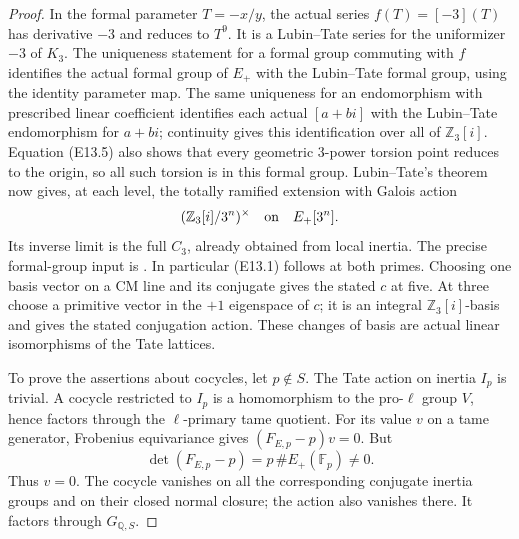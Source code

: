 \documentclass[11pt,oneside]{article}
\begin{document}
\begin{proof}
In the formal parameter $T=-x/y$, the actual series
$f(T)=[-3](T)$ has derivative $-3$ and reduces to $T^9$.
It is a Lubin--Tate series for the uniformizer $-3$ of $K_3$.
The uniqueness statement for a formal group commuting with
$f$ identifies the actual formal group of $E_+$ with the
Lubin--Tate formal group, using the identity parameter map.
The same uniqueness for an endomorphism with prescribed linear
coefficient identifies each actual $[a+bi]$ with the
Lubin--Tate endomorphism for $a+bi$; continuity gives this
identification over all of $\mathbb Z_3[i]$.
Equation (E13.5) also shows that every geometric $3$-power
torsion point reduces to the origin, so all such torsion is in
this formal group.  Lubin--Tate's theorem now gives, at each
level, the totally ramified extension with Galois action
\[
      (\mathbb Z_3[i]/3^n)^\times
             \quad\hbox{on}\quad E_+[3^n].
\]
Its inverse limit is the full $C_3$, already obtained from local
inertia.  The precise formal-group input is
\cite[Lemma 1, Theorem 1, and Theorem 2(b),(d),(e)]{E_density_LT}.
In particular (E13.1) follows at both primes.  Choosing one basis
vector on a CM line and its conjugate gives the stated $c$ at
five.  At three choose a primitive vector in the $+1$ eigenspace
of $c$; it is an integral $\mathbb Z_3[i]$-basis and gives the
stated conjugation action.  These changes of basis are actual
linear isomorphisms of the Tate lattices.

To prove the assertions about cocycles, let $p\notin S$.
The Tate action on inertia $I_p$ is trivial.  A cocycle restricted
to $I_p$ is a homomorphism to the pro-$\ell$ group $V$, hence
factors through the $\ell$-primary tame quotient.
For its value $v$ on a tame generator, Frobenius equivariance
gives $(F_{E,p}-p)v=0$.  But
\[
    \det(F_{E,p}-p)=p\,\#E_+(\mathbb F_p)\ne0.
\]
Thus $v=0$.  The cocycle vanishes on all the corresponding
conjugate inertia groups and on their closed normal closure;
the action also vanishes there.  It factors through $G_{\mathbb Q,S}$.


\end{proof}
\end{document}
